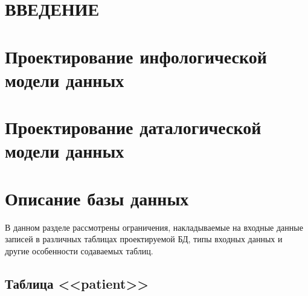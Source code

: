 






\newpage
{}
\tableofcontents

\newpage
{}


\titleformat{\section}{\centering\normalfont\normalsize}{\thesection}{1.0em}{}
\titleformat{\subsection}{\centering\normalfont\normalsize}{\thesubsection}{1.0em}{}
\titleformat{\subsubsection}{\centering\normalfont\normalsize}{\thesubsection}{1.0em}{}

\newpage
{}
\setcounter{section}{0}
\section*{ВВЕДЕНИЕ}


\newpage
\section{Проектирование инфологической модели данных}
\setcounter{figure}{0}


\newpage
\section{Проектирование даталогической модели данных}
\setcounter{figure}{0}


\newpage
\section{Описание базы данных}
\setcounter{figure}{0}
В данном разделе рассмотрены ограничения, накладываемые на входные данные записей в различных таблицах проектируемой БД, типы входных данных и другие особенности содаваемых таблиц.

\subsection{Таблица <<patient>>}

